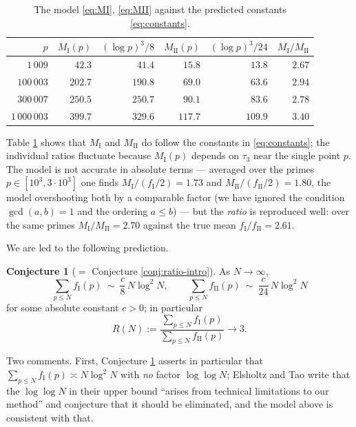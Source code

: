 \documentclass[11pt,reqno]{amsart}
\theoremstyle{plain}
\theoremstyle{definition}
\newtheorem{conjecture}[theorem]{Conjecture}
\numberwithin{equation}{section}
\newcommand{\fI}{f_{\mathrm{I}}}
\newcommand{\fII}{f_{\mathrm{II}}}
\begin{document}
\begin{table}[ht]
\caption{The model \eqref{eq:MI}, \eqref{eq:MII} against the predicted constants
\eqref{eq:constants}.}\label{tab:model}
\begin{tabular}{rrrrrr}
\toprule
$p$ & $M_{\mathrm{I}}(p)$ & $(\log p)^{3}/8$ & $M_{\mathrm{II}}(p)$ &
$(\log p)^{3}/24$ & $M_{\mathrm{I}}/M_{\mathrm{II}}$\\
\midrule
$1\,009$     & $42.3$  & $41.4$  & $15.8$  & $13.8$  & $2.67$\\
$100\,003$   & $202.7$ & $190.8$ & $69.0$  & $63.6$  & $2.94$\\
$300\,007$   & $250.5$ & $250.7$ & $90.1$  & $83.6$  & $2.78$\\
$1\,000\,003$& $399.7$ & $329.6$ & $117.7$ & $109.9$ & $3.40$\\
\bottomrule
\end{tabular}
\end{table}

Table \ref{tab:model} shows that $M_{\mathrm{I}}$ and $M_{\mathrm{II}}$ do follow the
constants in \eqref{eq:constants}; the individual ratios fluctuate because
$M_{\mathrm{I}}(p)$ depends on $\tau_{3}$ near the single point $p$. The model is not
accurate in absolute terms --- averaged over the primes $p\in[10^{3},3\cdot10^{3}]$ one
finds $M_{\mathrm{I}}/(\fI/2)=1.73$ and $M_{\mathrm{II}}/(\fII/2)=1.80$, the model
overshooting both by a comparable factor (we have ignored the condition $\gcd(a,b)=1$
and the ordering $a\le b$) --- but the \emph{ratio} is reproduced well: over the same
primes $M_{\mathrm{I}}/M_{\mathrm{II}}=2.70$ against the true mean
$\fI/\fII=2.61$.

We are led to the following prediction.

\begin{conjecture}[$=$ Conjecture \ref{conj:ratio-intro}]\label{conj:ratio}
As $N\to\infty$,
\[
  \sum_{p\le N}\fI(p)\ \sim\ \frac{c}{8}\,N\log^{2}N,\qquad
  \sum_{p\le N}\fII(p)\ \sim\ \frac{c}{24}\,N\log^{2}N
\]
for some absolute constant $c>0$; in particular
\[
  R(N):=\frac{\sum_{p\le N}\fI(p)}{\sum_{p\le N}\fII(p)}\longrightarrow 3 .
\]
\end{conjecture}

Two comments. First, Conjecture \ref{conj:ratio} asserts in particular that
$\sum_{p\le N}\fI(p)\asymp N\log^{2}N$ with \emph{no} factor $\log\log N$; Elsholtz and
Tao \cite[after Theorem 1.1]{ElsholtzTao} write that the $\log\log N$ in their upper
bound ``arises from technical limitations to our method'' and conjecture that it should
be eliminated, and the model above is consistent with that.
\end{document}

